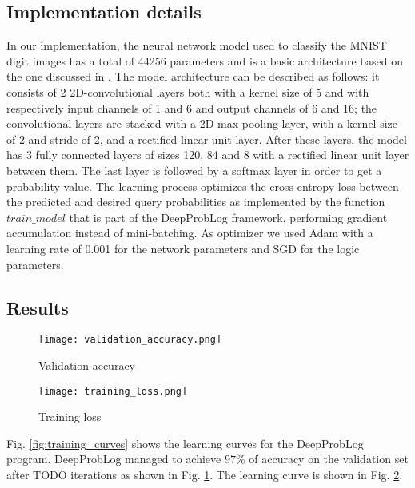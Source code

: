 \subsection{Implementation details}
In our implementation, the neural network model used to classify the MNIST digit images has a total of 44256 parameters and is a basic architecture based on the one discussed in \cite{DeepProbLog}. The model architecture can be described as follows: it consists of 2 2D-convolutional layers both with a kernel size of 5 and with respectively input channels of 1 and 6 and output channels of 6 and 16; the convolutional layers are stacked with a 2D max pooling layer, with a kernel size of 2 and stride of 2, and a rectified linear unit layer.
After these layers, the model has 3 fully connected layers of sizes 120, 84 and 8 with a rectified linear unit layer between them. The last layer is followed by a softmax layer in order to get a probability value.
The learning process optimizes the cross-entropy loss between the predicted and desired query probabilities as implemented by the function $train\_model$ that is part of the DeepProbLog framework, performing gradient accumulation instead of mini-batching.
As optimizer we used Adam with a learning rate of 0.001 for the network parameters and SGD for the logic parameters.



\subsection{Results}

\begin{figure*}[t]
    \centering
    \begin{subfigure}[b]{0.45\textwidth}
        \centerline{\texttt{[image: validation\_accuracy.png]}}
        \caption{Validation accuracy}
        \label{fig:acc}
    \end{subfigure}
    \hfill
    \begin{subfigure}[b]{0.45\textwidth}
        \centerline{\texttt{[image: training\_loss.png]}}
        \caption{Training loss}
        \label{fig:loss}
    \end{subfigure}
    \caption{Multi-digit MNIST octal-division task learning curves: accuracy on the multi-digit test set on the left \ref{fig:acc}, training loss on the single-digit training set on the right \ref{fig:loss}.}
    \label{fig:training_curves}
\end{figure*}

Fig. \ref{fig:training_curves} shows the learning curves for the DeepProbLog program.
DeepProbLog managed to achieve $97\%$ of accuracy on the validation set after TODO iterations as shown in Fig. \ref{fig:acc}. The learning curve is shown in Fig. \ref{fig:loss}.